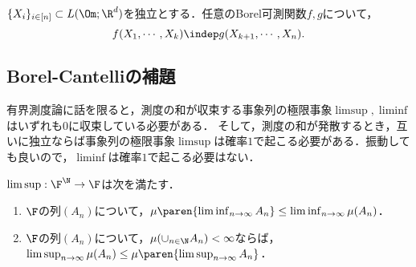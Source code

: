 \documentclass[uplatex,dvipdfmx]{jsreport}
\begin{document}
\begin{corollary}
    $\{X_i\}_{i\in[n]}\subset L(\Om;\R^d)$を独立とする．任意のBorel可測関数$f,g$について，
    \[f(X_1,\cdots,X_k)\indep g(X_{k+1},\cdots,X_n).\]
\end{corollary}

\subsection{Borel-Cantelliの補題}

\begin{tcolorbox}[colframe=ForestGreen, colback=ForestGreen!10!white,breakable,colbacktitle=ForestGreen!40!white,coltitle=black,fonttitle=\bfseries\sffamily,
title=]
    有界測度論に話を限ると，測度の和が収束する事象列の極限事象$\limsup,\liminf$はいずれも$0$に収束している必要がある．
    そして，測度の和が発散するとき，互いに独立ならば事象列の極限事象$\limsup$は確率$1$で起こる必要がある．振動しても良いので，$\liminf$は確率$1$で起こる必要はない．
\end{tcolorbox}

\begin{proposition}[集合に関するFatouの補題]
    $\limsup:\F^\N\to\F$は次を満たす．
    \begin{enumerate}
        \item $\F$の列$(A_n)$について，$\mu\paren{\liminf_{n\to\infty}A_n}\le\liminf_{n\to\infty}\mu(A_n)$．
        \item $\F$の列$(A_n)$について，$\mu(\cup_{n\in\N}A_n)<\infty$ならば，$\limsup_{n\to\infty}\mu(A_n)\le\mu\paren{\limsup_{n\to\infty}A_n}$．
    \end{enumerate}
\end{proposition}
\end{document}
